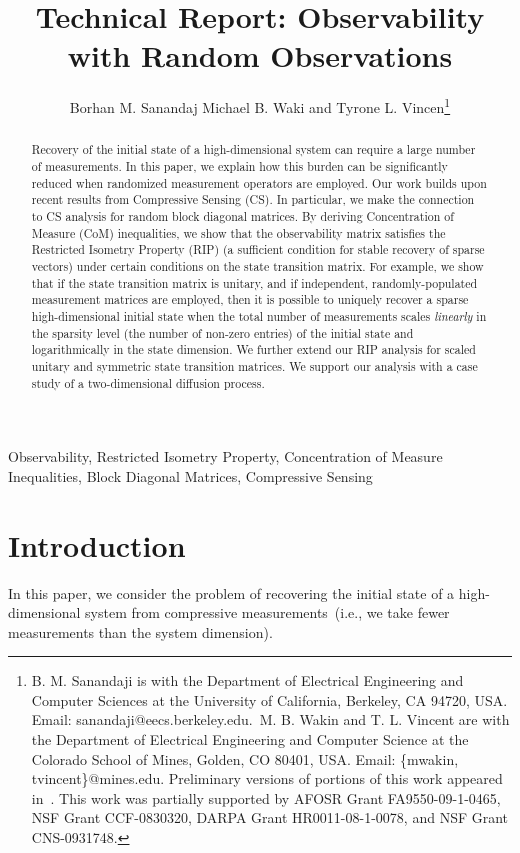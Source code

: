 \documentclass[11pt,draftcls,onecolumn]{IEEEtran}
\title{Technical Report: Observability \\with Random Observations}
\author{Borhan M. Sanandaj Michael B. Waki and Tyrone L. Vincen\thanks{\textsuperscript{}B. M. Sanandaji is with the Department of Electrical Engineering and Computer Sciences at the University of California, Berkeley, CA 94720, USA. Email: sanandaji@eecs.berkeley.edu.~\textsuperscript{}M. B. Wakin and T. L. Vincent are with the Department of Electrical Engineering and Computer Science at the Colorado School of Mines, Golden, CO 80401, USA. Email: \{mwakin, tvincent\}@mines.edu. Preliminary versions of portions of this work appeared in~\cite{wakin2010observability}. This work was partially supported by AFOSR Grant FA9550-09-1-0465, NSF Grant CCF-0830320, DARPA Grant HR0011-08-1-0078, and NSF Grant CNS-0931748.}
}
\newcommand{\cut}[1]{}
\begin{document}
\maketitle

\begin{abstract}

Recovery of the initial state of a high-dimensional system can require a large number of measurements. In this paper, we explain how this burden can be significantly reduced when randomized measurement operators are employed. Our work builds upon recent results from Compressive Sensing (CS). In particular, we make the connection to CS analysis for random
block diagonal matrices.
By deriving Concentration of Measure (CoM) inequalities, we show that the observability matrix satisfies the Restricted Isometry Property (RIP) (a sufficient condition for stable recovery of sparse vectors) under certain conditions on the state transition matrix. For example, we show that if the state transition matrix is unitary, and if independent, randomly-populated measurement matrices are employed, then it is possible to uniquely recover a sparse high-dimensional initial state when the total number of measurements scales \emph{linearly} in the sparsity level (the number of non-zero entries) of the initial state and logarithmically in the state dimension. \cut{This is in fact a significant reduction in the sufficient total number of measurement for correct initial state recovery as compared to traditional observability theory.}We further extend our RIP analysis for scaled unitary and symmetric state transition matrices. We support our analysis with a case study of a two-dimensional diffusion process.
\end{abstract}



\begin{keywords}
Observability, Restricted Isometry Property, Concentration of Measure Inequalities, Block Diagonal Matrices, Compressive Sensing
\end{keywords}




\section{Introduction}
\label{sec:intro}

In this paper, we consider the problem of recovering the initial state of a high-dimensional system from
compressive measurements~(i.e., we take fewer measurements than the system dimension).
\end{document}
